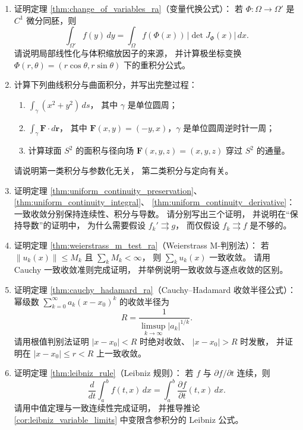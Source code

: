 \begin{enumerate}[leftmargin=3em, label=\textbf{题 \arabic*}]
    \item 证明定理 \ref{thm:change_of_variables_ra}（变量代换公式）：
    若 $\Phi:\Omega\to\Omega'$ 是 $C^1$ 微分同胚，则
    \[
    \int_{\Omega'}f(y)\,dy
    =
    \int_{\Omega}f(\Phi(x))\,|\det J_\Phi(x)|\,dx.
    \]
    请说明局部线性化与体积缩放因子的来源，
    并计算极坐标变换
    $\Phi(r,\theta)=(r\cos\theta,r\sin\theta)$ 下的重积分公式。

    \item 计算下列曲线积分与曲面积分，并写出完整过程：
    \begin{enumerate}[label=(\roman*)]
        \item $\displaystyle\int_{\gamma}(x^2+y^2)\,ds$，
        其中 $\gamma$ 是单位圆周；
        \item $\displaystyle\int_{\gamma}\mathbf{F}\cdot d\mathbf{r}$，
        其中 $\mathbf{F}(x,y)=(-y,x)$，$\gamma$ 是单位圆周逆时针一周；
        \item 计算球面 $S^2$ 的面积与径向场
        $\mathbf{F}(x,y,z)=(x,y,z)$ 穿过 $S^2$ 的通量。
    \end{enumerate}
    请说明第一类积分与参数化无关，
    第二类积分与定向有关。

    \item 证明定理 \ref{thm:uniform_continuity_preservation}、
    \ref{thm:uniform_continuity_integral}、
    \ref{thm:uniform_continuity_derivative}：
    一致收敛分别保持连续性、积分与导数。
    请分别写出三个证明，
    并说明在“保持导数”的证明中，
    为什么需要假设 $f_k'\rightrightarrows g$，
    而仅假设 $f_k\rightrightarrows f$ 是不够的。

    \item 证明定理 \ref{thm:weierstrass_m_test_ra}（Weierstrass M-判别法）：
    若 $\|u_k(x)\|\le M_k$ 且 $\sum_k M_k<\infty$，
    则 $\sum_k u_k(x)$ 一致收敛。
    请用 Cauchy 一致收敛准则完成证明，
    并举例说明一致收敛与逐点收敛的区别。

    \item 证明定理 \ref{thm:cauchy_hadamard_ra}（Cauchy--Hadamard 收敛半径公式）：
    幂级数 $\sum_{k=0}^\infty a_k(x-x_0)^k$ 的收敛半径为
    \[
    R=\frac{1}{\limsup_{k\to\infty}|a_k|^{1/k}}.
    \]
    请用根值判别法证明 $|x-x_0|<R$ 时绝对收敛、
    $|x-x_0|>R$ 时发散，
    并证明在 $|x-x_0|\le r<R$ 上一致收敛。

    \item 证明定理 \ref{thm:leibniz_rule}（Leibniz 规则）：
    若 $f$ 与 $\partial f/\partial t$ 连续，则
    \[
    \frac{d}{dt}\int_a^b f(t,x)\,dx
    =
    \int_a^b\frac{\partial f}{\partial t}(t,x)\,dx.
    \]
    请用中值定理与一致连续性完成证明，
    并推导推论 \ref{cor:leibniz_variable_limits}
    中变限含参积分的 Leibniz 公式。


\end{enumerate}
